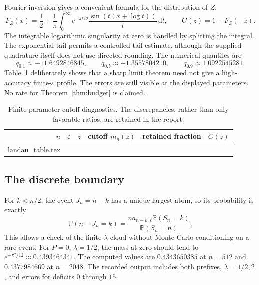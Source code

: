 \documentclass[11pt,a4paper]{article}
\makeatletter
\theoremstyle{definition}\newtheorem{definition}[theorem]{Definition}
\theoremstyle{remark}\newtheorem{remark}[theorem]{Remark}
\newcommand{\eps}{\varepsilon}
\newcommand{\Prob}{\mathbb P}
\newcommand{\1}{\mathbf 1}
\newcommand{\dd}{\,\mathrm d}
\newcommand{\inputtable}[1]{\@@input #1 }
\makeatother
\begin{document}
Fourier inversion gives a convenient formula for the distribution of
$Z$:
\begin{equation}\label{eq:CDF}
 F_Z(x)=\frac12+\frac1\pi\int_0^\infty
 e^{-\pi t/2}\frac{\sin(t(x+\log t))}{t}\dd t,
 \qquad G(z)=1-F_Z(-z).
\end{equation}
The integrable logarithmic singularity at zero is handled by splitting
the integral. The exponential tail permits a controlled tail estimate,
although the supplied quadrature itself does not use directed rounding.
The numerical quantiles are
\begin{equation}\label{eq:quantilenumbers}
 q_{0.1}\approx-11.6492846845,\qquad
 q_{0.5}\approx-1.3557804210,\qquad
 q_{0.9}\approx1.0922545281.
\end{equation}
Table~\ref{tab:landau} deliberately shows that a sharp limit theorem need
not give a high-accuracy finite-$\eps$ profile. The errors are still
visible at the displayed parameters. No rate for
Theorem~\ref{thm:budget} is claimed.

\begin{table}[htbp]\centering\small
\begin{tabular}{@{}rrrrrr@{}}
\toprule
$n$ & $\eps$ & $z$ & cutoff $m_n(z)$ & retained fraction & $G(z)$\\
\midrule
\inputtable{landau_table.tex}
\bottomrule
\end{tabular}
\caption{Finite-parameter cutoff diagnostics. The discrepancies, rather
than only favorable ratios, are retained in the report.}
\label{tab:landau}
\end{table}

\subsection{The discrete boundary}

For $k<n/2$, the event $J_n=n-k$ has a unique largest atom, so its
probability is exactly
\begin{equation}\label{eq:deficitExact}
 \Prob(n-J_n=k)
 =\frac{n a_{n-k,\eps}\Prob(S_n=k)}{\Prob(S_n=n)}.
\end{equation}
This allows a check of the finite-$\lambda$ cloud without Monte Carlo
conditioning on a rare event. For $P=0$, $\lambda=1/2$, the mass at zero
should tend to $e^{-\pi^2/12}\approx0.4393464341$. The computed values
are $0.4343650385$ at $n=512$ and $0.4377984669$ at $n=2048$.
The recorded output includes both prefixes, $\lambda=1/2,2$, and
errors for deficits $0$ through $15$.
\end{document}
